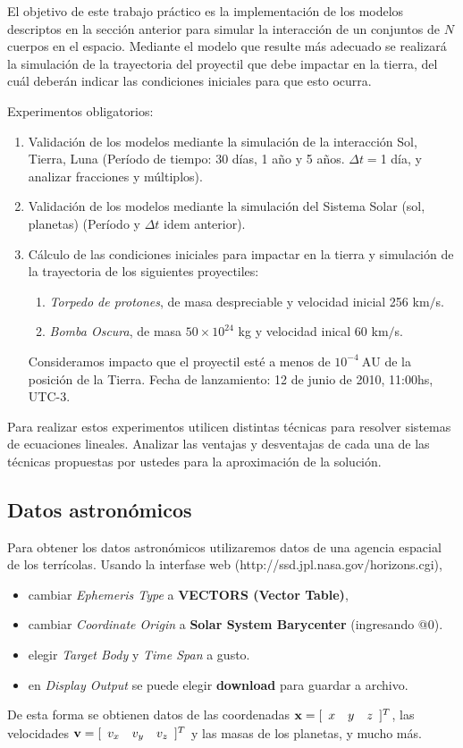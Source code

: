 El objetivo de este trabajo práctico es la implementación de los modelos descriptos en la sección anterior para simular la interacción de un conjuntos de $N$ cuerpos en el espacio. Mediante el modelo que resulte más adecuado se realizará la simulación de la trayectoria del proyectil que debe impactar en la tierra, del cuál deberán indicar las condiciones iniciales para que esto ocurra.

Experimentos obligatorios:
\begin{enumerate}
 \item Validación de los modelos mediante la simulación de la interacción Sol, Tierra, Luna  
  (Período de tiempo: 30 días, 1 año y 5 años. $\Delta t=$1 día, y analizar fracciones y múltiplos).
 \item Validación de los modelos mediante la simulación del Sistema Solar (sol, planetas) (Período y $\Delta t$ idem anterior).
 \item Cálculo de las condiciones iniciales para impactar en la tierra y simulación de la trayectoria de los siguientes proyectiles: 
	\begin{enumerate}
	\item \emph{Torpedo de protones}, de masa despreciable y velocidad inicial 256 km$/$s.
	\item \emph{Bomba Oscura}, de masa $50\times 10^{24}$ kg y velocidad inical 60 km$/$s.
	\end{enumerate}
Consideramos impacto que el proyectil esté a menos de $10^{-4} \ \mbox{AU}$ de la posición de la Tierra. Fecha de lanzamiento: 12 de junio de 2010, 11:00hs, UTC-3.
\end{enumerate}

Para realizar estos experimentos utilicen distintas técnicas para resolver sistemas de ecuaciones lineales. Analizar las ventajas y desventajas de cada una de las técnicas propuestas por ustedes para la aproximación de la solución.

\subsection*{Datos astronómicos}
Para obtener los datos astronómicos utilizaremos datos de una agencia espacial de los terrícolas. Usando la interfase web (http://ssd.jpl.nasa.gov/horizons.cgi),
\begin{itemize}
 \item cambiar \emph{Ephemeris Type} a {\bf VECTORS (Vector Table)},
 \item cambiar \emph{Coordinate Origin} a {\bf Solar System Barycenter} (ingresando @0).
 \item elegir \emph{Target Body} y \emph{Time Span} a gusto.
 \item en \emph{Display Output} se puede elegir {\bf download} para guardar a archivo.
\end{itemize}
De esta forma se obtienen datos de las coordenadas ${\bf x} = [\begin{array}{ccc} x & y & z \end{array}]^T$, las velocidades ${\bf v} = [\begin{array}{ccc} v_x & v_y & v_z \end{array}]^T$ y las masas de los planetas, y mucho más.

